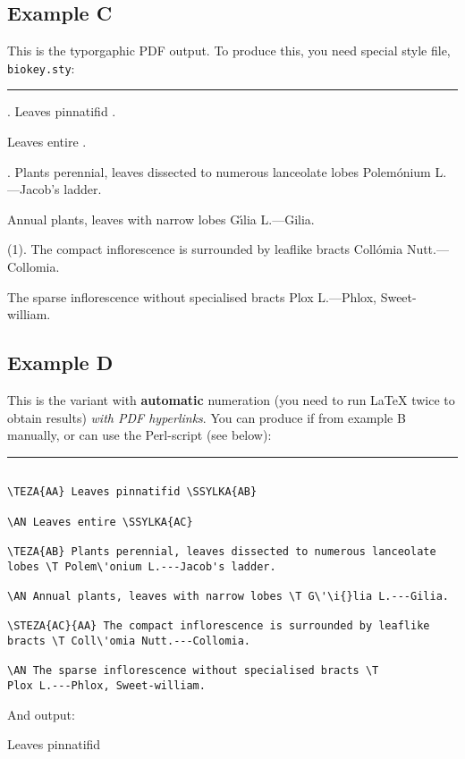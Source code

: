 \documentclass[a4paper,12pt]{article}
\begin{document}
\subsection*{Example C}

This is the typorgaphic PDF output. To produce this, you need special style file, \texttt{biokey.sty}:

\bigskip\hrule\bigskip

. Leaves pinnatifid .

\AN Leaves entire .

. Plants perennial, leaves dissected to numerous lanceolate 
lobes \T Polem\'onium L.---Jacob's ladder.

\AN Annual plants, leaves with narrow lobes \T G\'\i{}lia L.---Gilia.

(1). The compact inflorescence is surrounded by leaflike 
bracts \T\KN Coll\'omia Nutt.---Collomia.

\AN The sparse inflorescence without specialised bracts \T
Plox L.---Phlox, Sweet-william.

\subsection*{Example D}

This is the variant with \textbf{automatic} numeration (you need to run \LaTeX{} twice to obtain results) \emph{with PDF hyperlinks}. You can produce if from example B manually, or can use the Perl-script (see below):

\bigskip\hrule
\begin{verbatim}

\TEZA{AA} Leaves pinnatifid \SSYLKA{AB}

\AN Leaves entire \SSYLKA{AC}

\TEZA{AB} Plants perennial, leaves dissected to numerous lanceolate 
lobes \T Polem\'onium L.---Jacob's ladder.

\AN Annual plants, leaves with narrow lobes \T G\'\i{}lia L.---Gilia.

\STEZA{AC}{AA} The compact inflorescence is surrounded by leaflike 
bracts \T Coll\'omia Nutt.---Collomia.

\AN The sparse inflorescence without specialised bracts \T
Plox L.---Phlox, Sweet-william.

\end{verbatim}

And output:

\bigskip

 Leaves pinnatifid 
\end{document}
